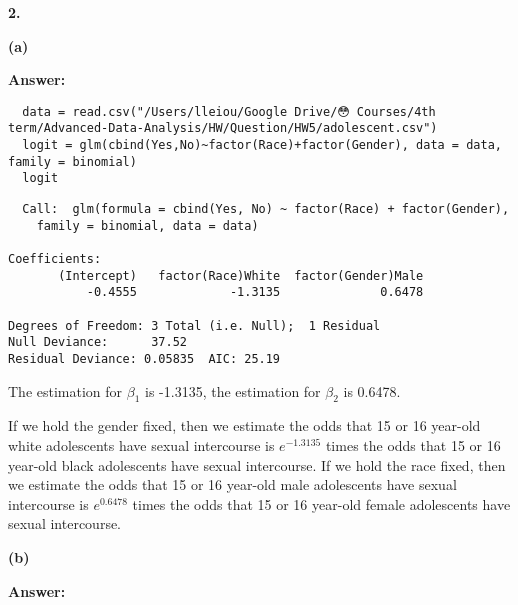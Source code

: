 \documentclass[letterpaper,11pt]{article}
\begin{document}
\begin{addmargin}[-2em]{0em}
  \large{\textbf{2. }}
\end{addmargin}
\textbf{}\par

\begin{addmargin}[-1.1em]{0em}
  \textbf{(a)}\par
\end{addmargin}
\textbf{}\par
\bigbreak
\begin{addmargin}[-0.5em]{0em}
  \textbf{Answer: }
\end{addmargin}

\begin{lstlisting}
  data = read.csv("/Users/lleiou/Google Drive/😳 Courses/4th term/Advanced-Data-Analysis/HW/Question/HW5/adolescent.csv")
  logit = glm(cbind(Yes,No)~factor(Race)+factor(Gender), data = data, family = binomial)
  logit
\end{lstlisting}
\begin{lstlisting}
  Call:  glm(formula = cbind(Yes, No) ~ factor(Race) + factor(Gender),
    family = binomial, data = data)

Coefficients:
       (Intercept)   factor(Race)White  factor(Gender)Male
           -0.4555             -1.3135              0.6478

Degrees of Freedom: 3 Total (i.e. Null);  1 Residual
Null Deviance:	    37.52
Residual Deviance: 0.05835 	AIC: 25.19
\end{lstlisting}
The estimation for $\beta_1$ is -1.3135, the estimation for $\beta_2$ is 0.6478.\par
If we hold the gender fixed, then we estimate the odds that 15 or 16 year-old white adolescents have sexual intercourse is $e^{-1.3135}$ times the odds that 15 or 16 year-old black adolescents have sexual intercourse.
If we hold the race fixed, then we estimate the odds that 15 or 16 year-old male adolescents have sexual intercourse is $e^{0.6478}$ times the odds that 15 or 16 year-old female adolescents have sexual intercourse.


\begin{addmargin}[-1.1em]{0em}
  \textbf{(b)}\par
\end{addmargin}
\textbf{}\par
\bigbreak
\begin{addmargin}[-0.5em]{0em}
  \textbf{Answer: }
\end{addmargin}
\end{document}
